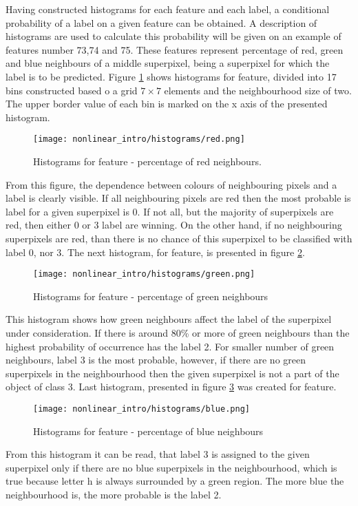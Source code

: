 Having constructed histograms for each feature and each label, a conditional probability of a label on a given feature can be obtained. A description of histograms are used to calculate this probability will be given on an example of features number 73,74 and 75. These features represent percentage of red, green and blue neighbours of a middle superpixel, being a superpixel for which the label is to be predicted. Figure \ref{fig:nonlinear_histogram_red} shows histograms for  feature, divided into 17 bins constructed based o a grid $7 \times 7$ elements and the neighbourhood size of two. The upper border value of each bin is marked on the x axis of the presented histogram. 
\begin{figure}[!htb]
    \centering
    \texttt{[image: nonlinear\_intro/histograms/red.png]}
    \caption{Histograms for  feature - percentage of red neighbours.}
    \label{fig:nonlinear_histogram_red}
\end{figure}
From this figure, the dependence between colours of neighbouring pixels and a label is clearly visible. If all neighbouring pixels are red then the most probable is label for a given superpixel is 0. If not all, but the majority of superpixels are red, then either 0 or 3 label are winning. On the other hand, if no neighbouring superpixels are red, than there is no chance of this superpixel to be classified with label 0, nor 3. The next histogram, for  feature, is presented in figure \ref{fig:nonlinear_histogram_green}.
\begin{figure}[!htb]
    \centering
    \texttt{[image: nonlinear\_intro/histograms/green.png]}
    \caption{Histograms for  feature - percentage of green neighbours}
    \label{fig:nonlinear_histogram_green}
\end{figure}
This histogram shows how green neighbours affect the label of the superpixel under consideration. If there is around 80\% or more of green neighbours than the highest probability of occurrence has the label 2. For smaller number of green neighbours, label 3 is the most probable, however, if there are no green superpixels in the neighbourhood then the given superpixel is not a part of the object of class 3. Last histogram, presented in figure \ref{fig:nonlinear_histogram_blue} was created for  feature.
\begin{figure}[!htb]
    \centering
    \texttt{[image: nonlinear\_intro/histograms/blue.png]}
    \caption{Histograms for  feature - percentage of blue neighbours}
    \label{fig:nonlinear_histogram_blue}
\end{figure}
From this histogram it can be read, that label 3 is assigned to the given superpixel only if there are no blue superpixels in the neighbourhood, which is true because letter h is always surrounded by a green region. The more blue the neighbourhood is, the more probable is the label 2.

